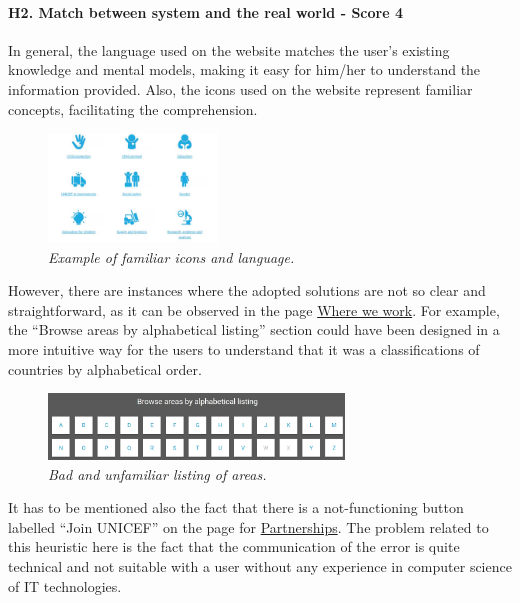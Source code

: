 \paragraph{H2. Match between system and the real world - Score 4} \label{subsec:H2}	In general, the language used on the website matches the user’s existing knowledge and mental models, making it easy for him/her to understand the information provided. Also, the icons used on the website represent familiar concepts, facilitating the comprehension.
\begin{figure}[!h]
	\begin{center}
		\includegraphics[width=0.4\textwidth]{FinalScores4.jpg}
		\captionsetup{font=small}
		\caption{\textit{Example of familiar icons and language.}}
	\end{center}
\end{figure}
\newline However, there are instances where the adopted solutions are not so clear and straightforward, as it can be observed in the page \href{https://www.unicef.org/where-we-work}{Where we work}. For example, the “Browse areas by alphabetical listing” section could have been designed in a more intuitive way for the users to understand that it was a classifications of countries by alphabetical order.
\begin{figure}[!h]
	\begin{center}
		\includegraphics[width=0.7\textwidth]{FinalScores5.jpg}
		\captionsetup{font=small}
		\caption{\textit{Bad and unfamiliar listing of areas.}}
	\end{center}
\end{figure}
\newline
\newline
It has to be mentioned also the fact that there is a not-functioning button labelled “Join UNICEF” on the page for  \href{https://www.unicef.org/partnerships}{Partnerships}. The problem related to this heuristic here is the fact that the communication of the error is quite technical and not suitable with a user without any experience in computer science of IT technologies.












